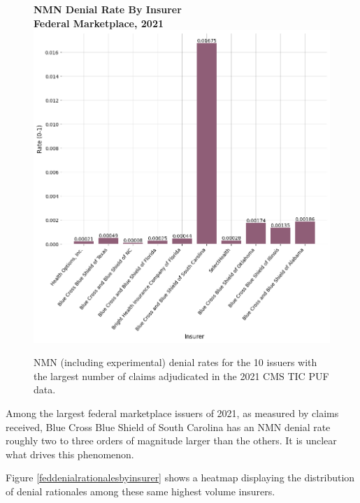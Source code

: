 \documentclass[12pt, a4paper,twoside,parskip=full]{report}
\theoremstyle{plain} %
\theoremstyle{definition} %
\theoremstyle{remark} %
\numberwithin{equation}{chapter}
\begin{document}
		\begin{figure}[h!]
			\centering
			\textbf{NMN Denial Rate By Insurer}\\
			\textbf{Federal Marketplace, 2021}\\
			\includegraphics[width=\columnwidth]{images/cms_puf/nmn_denial_rate_by_insurer.png}
			\caption{NMN (including experimental) denial rates for the 10 issuers with the largest number of claims adjudicated in the 2021 CMS TIC PUF data.}
			\label{fedinsurernmndenialrates}
		\end{figure}
	
		Among the largest federal marketplace issuers of 2021, as measured by claims received, Blue Cross Blue Shield of South Carolina has an NMN denial rate roughly two to three orders of magnitude larger than the others. It is unclear what drives this phenomenon.
		
		Figure \ref{feddenialrationalesbyinsurer} shows a heatmap displaying the distribution of denial rationales among these same highest volume insurers.
		
\end{document}
